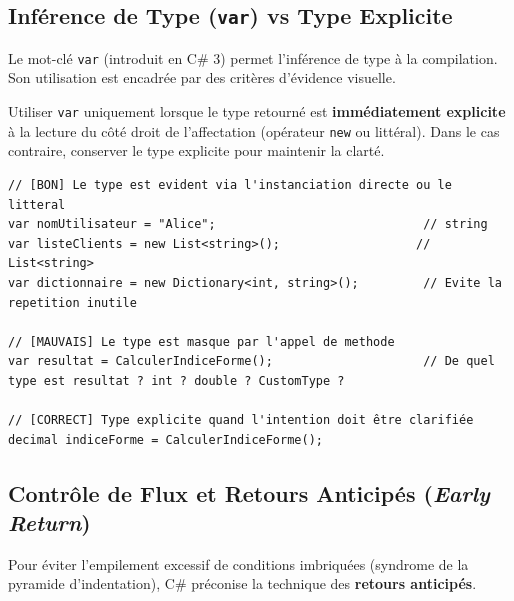 \subsection{Inférence de Type (\texttt{var}) vs Type Explicite}

Le mot-clé \texttt{var} (introduit en C\# 3) permet l'inférence de type à la compilation. Son utilisation est encadrée par des critères d'évidence visuelle.

\begin{tcolorbox}[colback=white,colframe=keywordcolor,title=\textbf{Règle d'or de l'inférence \texttt{var}}]
    Utiliser \texttt{var} uniquement lorsque le type retourné est \textbf{immédiatement explicite} à la lecture du côté droit de l'affectation (opérateur \texttt{new} ou littéral). Dans le cas contraire, conserver le type explicite pour maintenir la clarté.
\end{tcolorbox}

\begin{lstlisting}[caption={Usage correct et incorrect de var}]
// [BON] Le type est evident via l'instanciation directe ou le litteral
var nomUtilisateur = "Alice";                             // string
var listeClients = new List<string>();                   // List<string>
var dictionnaire = new Dictionary<int, string>();         // Evite la repetition inutile

// [MAUVAIS] Le type est masque par l'appel de methode
var resultat = CalculerIndiceForme();                     // De quel type est resultat ? int ? double ? CustomType ?

// [CORRECT] Type explicite quand l'intention doit être clarifiée
decimal indiceForme = CalculerIndiceForme();
\end{lstlisting}



\subsection{Contrôle de Flux et Retours Anticipés (\emph{Early Return})}

Pour éviter l'empilement excessif de conditions imbriquées (syndrome de la pyramide d'indentation), C\# préconise la technique des \textbf{retours anticipés}.

